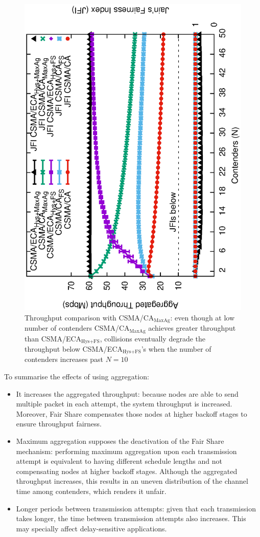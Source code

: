 	\begin{figure}[tb]
	\centering
		\includegraphics[width=0.7\linewidth,angle=-90]{figures/throughput-max-Ag/throughput-saturated-maxAgg-TON.eps}
		\caption{Throughput comparison with CSMA/CA$_{\text{MaxAg}}$: even though at low number of contenders CSMA/CA$_{\text{MaxAg}}$ achieves greater throughput than CSMA/ECA$_{\text{Hys+FS}}$, collisions eventually degrade the throughput below CSMA/ECA$_{\text{Hys+FS}}$'s when the number of contenders increases past $N=10$}
		\label{fig:ECA-vs-DCF-maxAgg}
	\end{figure}
	
	To summarise the effects of using aggregation:
	\begin{itemize}
		\item It increases the aggregated throughput: because nodes are able to send multiple packet in each attempt, the system throughput is increased. Moreover, Fair Share compensates those nodes at higher backoff stages to ensure throughput fairness.
		\item Maximum aggregation supposes the deactivation of the Fair Share mechanism: performing maximum aggregation upon each transmission attempt is equivalent to having different schedule lengths and not compensating nodes at higher backoff stages. Although the aggregated throughput increases, this results in an uneven distribution of the channel time among contenders, which renders it unfair.
		\item Longer periods between transmission attempts: given that each transmission takes longer, the time between transmission attempts also increases. This may specially affect delay-sensitive applications.
	\end{itemize}

